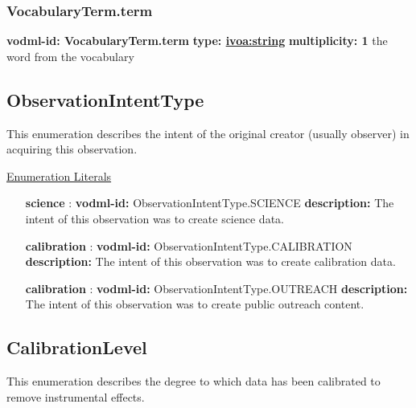     \subsubsection{VocabularyTerm.term}
      \textbf{vodml-id: VocabularyTerm.term} \newline
      \textbf{type: \hyperref[sect:ivoa]{ivoa:string}} \newline
      \textbf{multiplicity: 1} \newline
      the word from the vocabulary

  \subsection{ObservationIntentType}
  \label{sect:ObservationIntentType}

  This enumeration describes the intent of the original creator (usually observer) in acquiring this observation.

  \noindent \underline{Enumeration Literals}
  \vspace{-\parsep}
  \small
  \begin{itemize}
  
    \item[\textbf{science}]: \textbf{vodml-id:} ObservationIntentType.SCIENCE \newline
          \textbf{description:} The intent of this observation was to create science data.
    \item[\textbf{calibration}]: \textbf{vodml-id:} ObservationIntentType.CALIBRATION \newline
          \textbf{description:} The intent of this observation was to create calibration data.
    \item[\textbf{calibration}]: \textbf{vodml-id:} ObservationIntentType.OUTREACH \newline
          \textbf{description:} The intent of this observation was to create public outreach content.
  \end{itemize}
  \normalsize


  \subsection{CalibrationLevel}
  \label{sect:CalibrationLevel}

  This enumeration describes the degree to which data has been calibrated to remove instrumental effects. 

